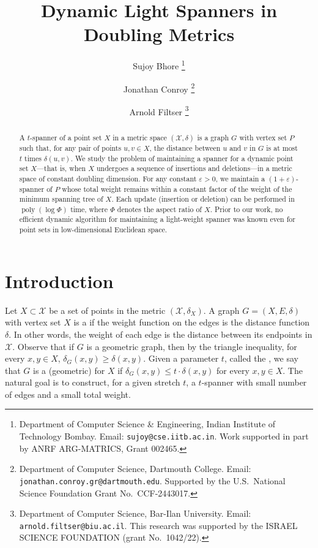 \documentclass[11pt]{article}
\title{Dynamic Light Spanners in Doubling Metrics}
\date{}
\author{%
Sujoy Bhore%
\thanks{Department of Computer Science \& Engineering, Indian Institute of Technology Bombay. Email: \texttt{sujoy@cse.iitb.ac.in}. Work supported in part by ANRF ARG-MATRICS, Grant 002465.
}
\and
Jonathan Conroy%
\thanks{Department of Computer Science, Dartmouth College. Email: {\tt jonathan.conroy.gr@dartmouth.edu}. Supported by the U.S.\ National Science Foundation Grant No.\ CCF-2443017.
}
\and
Arnold Filtser%
\thanks{Department of Computer Science, Bar-Ilan University. Email: \texttt{arnold.filtser@biu.ac.il}. This research was supported by the ISRAEL SCIENCE FOUNDATION (grant No.\ 1042/22).
}}
\newcommand{\cX}{\mathcal{X}}
\newcommand{\dist}{\ensuremath{\delta}}
\begin{document}
\maketitle

\begin{abstract}
A $t$-spanner of a point set $X$ in a metric space $(\mathcal{X}, \delta)$ is a graph $G$ with vertex set $P$ such that, for any pair of points $u,v \in X$, the distance between $u$ and $v$ in $G$ is at most $t$ times $\delta(u,v)$. We study the problem of maintaining a spanner for a dynamic point set $X$---that is, when $X$ undergoes a sequence of insertions and deletions---in a metric space of constant doubling dimension. For any constant $\varepsilon>0$, we maintain a $(1+\varepsilon)$-spanner of $P$ whose total weight remains within a constant factor of the weight of the minimum spanning tree of $X$. Each update (insertion or deletion) can be performed in $\operatorname{poly}(\log \Phi)$ time, where $\Phi$ denotes the aspect ratio of $X$. Prior to our work, no efficient dynamic algorithm for maintaining a light-weight spanner was known even for point sets in low-dimensional Euclidean space.
\end{abstract}

\section{Introduction}
Let $X\subset \cX$ be a set of points in the metric $(\cX,\delta_X)$. A graph $G= (X,E,\delta)$ with vertex set $X$ is a  if the weight function on the edges is the distance function $\delta$. In other words, the weight of each edge is the distance between its endpoints in $\cX$. Observe that if $G$ is a geometric graph, then by the triangle inequality, for every $x,y\in X$, $\delta_G(x,y)\geq \delta(x,y)$.  Given a parameter $t$, called the , we say that  $G$ is a (geometric)  for $X$ if $\dist_G(x,y)\leq t\cdot \delta(x,y)$ for every $x,y\in X$. The natural goal is to construct, for a given stretch $t$, a $t$-spanner with small number of edges and a small total weight.
\end{document}

